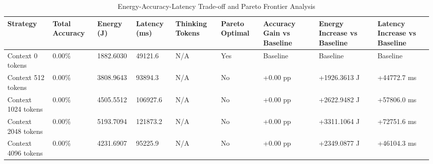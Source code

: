 \begin{table}
\caption{Energy-Accuracy-Latency Trade-off and Pareto Frontier Analysis}
\label{tab:tradeoff_comparison}
\begin{tabular}{lllllllll}
\toprule
Strategy & Total Accuracy & Energy (J) & Latency (ms) & Thinking Tokens & Pareto Optimal & Accuracy Gain vs Baseline & Energy Increase vs Baseline & Latency Increase vs Baseline \\
\midrule
Context 0 tokens & 0.00\% & 1882.6030 & 49121.6 & N/A & Yes & Baseline & Baseline & Baseline \\
Context 512 tokens & 0.00\% & 3808.9643 & 93894.3 & N/A & No & +0.00 pp & +1926.3613 J & +44772.7 ms \\
Context 1024 tokens & 0.00\% & 4505.5512 & 106927.6 & N/A & No & +0.00 pp & +2622.9482 J & +57806.0 ms \\
Context 2048 tokens & 0.00\% & 5193.7094 & 121873.2 & N/A & No & +0.00 pp & +3311.1064 J & +72751.6 ms \\
Context 4096 tokens & 0.00\% & 4231.6907 & 95225.9 & N/A & No & +0.00 pp & +2349.0877 J & +46104.3 ms \\
\bottomrule
\end{tabular}
\end{table}

